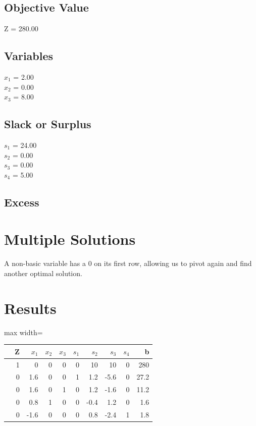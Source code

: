 \documentclass[12pt,a4paper]{article}
\begin{document}
\subsection*{Objective Value}
Z = 280.00

\subsection*{Variables}
$x_1$ = 2.00 \\
$x_2$ = 0.00 \\
$x_3$ = 8.00 \\

\subsection*{Slack or Surplus}
$s_1$ = 24.00 \\
$s_2$ = 0.00 \\
$s_3$ = 0.00 \\
$s_4$ = 5.00 \\

\subsection*{Excess}
\newpage
\section*{Multiple Solutions}
A non-basic variable has a 0 on its first row, allowing us to pivot again and find another optimal solution.

\section*{Results}
\begin{table}[H]
\centering
\begin{adjustbox}{max width=\textwidth}\begin{tabular}{c|rrrrrrrrr}
& Z & $x_1$& $x_2$& $x_3$& $s_1$& $s_2$& $s_3$& $s_4$& b\\ \hline
& 1& 0& 0& 0& 0& 10& 10& 0& 280\\
& 0& 1.6& 0& 0& 1& 1.2& -5.6& 0& 27.2\\
& 0& 1.6& 0& 1& 0& 1.2& -1.6& 0& 11.2\\
& 0& 0.8& 1& 0& 0& -0.4& 1.2& 0& 1.6\\
& 0& -1.6& 0& 0& 0& 0.8& -2.4& 1& 1.8\\
\end{tabular}
\end{adjustbox}
\end{table}
\end{document}
